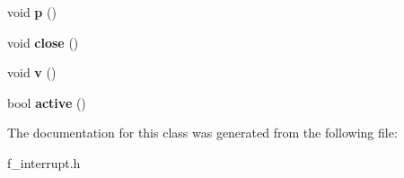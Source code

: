 \begin{DoxyCompactItemize}
void {\bfseries p} ()
\item 
\mbox{\label{classfsl_1_1hw_1_1lite__atomic_a73376c64bd5cfd04ed5d0732e55d06f9}} 
void {\bfseries close} ()
\item 
\mbox{\label{classfsl_1_1hw_1_1lite__atomic_acb7586bc666d256b11e1049e843b6b0e}} 
void {\bfseries v} ()
\item 
\mbox{\label{classfsl_1_1hw_1_1lite__atomic_a6f9a2dd48c3b00e92dbb35d5c83de5b5}} 
bool {\bfseries active} ()
\end{DoxyCompactItemize}


The documentation for this class was generated from the following file\+:\begin{DoxyCompactItemize}
\item 
f\+\_\+interrupt.\+h\end{DoxyCompactItemize}
